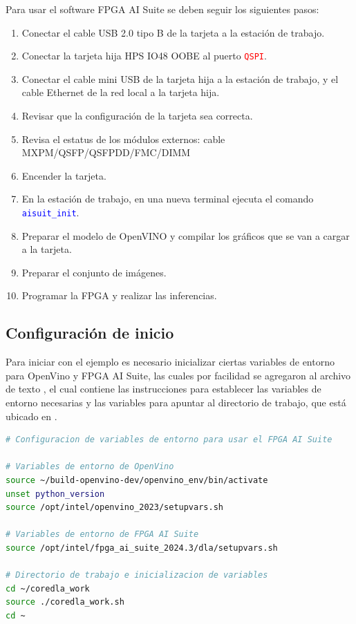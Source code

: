     Para usar el software FPGA AI Suite se deben seguir los siguientes pasos:
    \begin{enumerate}
        \item Conectar el cable USB 2.0 tipo B de la tarjeta a la estaci\'on de trabajo.
        \item Conectar la tarjeta hija HPS IO48 OOBE al puerto \texttt{\textcolor{red}{QSPI}}.
        \item Conectar el cable mini USB de la tarjeta hija a la estaci\'on de trabajo, y el cable Ethernet de la red local a la tarjeta hija.
        \item Revisar que la configuraci\'on de la tarjeta sea correcta. 
        \item Revisa el estatus de los m\'odulos externos: cable MXPM/QSFP/QSFPDD/FMC/DIMM
        \item Encender la tarjeta.
        \item En la estaci\'on de trabajo, en una nueva terminal ejecuta el comando \texttt{\textcolor{blue}{aisuit\_init}}.
        \item Preparar el modelo de OpenVINO y compilar los gr\'aficos que se van a cargar a la tarjeta.
        \item Preparar el conjunto de im\'agenes.
        \item Programar la FPGA y realizar las inferencias.
    \end{enumerate}

    \subsection{Configuraci\'on de inicio}

    Para iniciar con el ejemplo es necesario inicializar ciertas variables de entorno para OpenVino y FPGA AI Suite, las cuales por facilidad se agregaron al archivo de texto , el cual contiene las instrucciones para establecer las variables de entorno necesarias y las variables para apuntar al directorio de trabajo, que est\'a ubicado en .

    \begin{lstlisting}[language=bash, label=cod3]
# Configuracion de variables de entorno para usar el FPGA AI Suite

# Variables de entorno de OpenVino
source ~/build-openvino-dev/openvino_env/bin/activate
unset python_version
source /opt/intel/openvino_2023/setupvars.sh

# Variables de entorno de FPGA AI Suite
source /opt/intel/fpga_ai_suite_2024.3/dla/setupvars.sh

# Directorio de trabajo e inicializacion de variables
cd ~/coredla_work
source ./coredla_work.sh
cd ~
\end{lstlisting}


